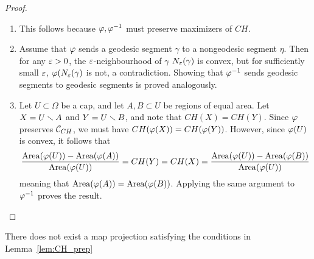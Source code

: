 \begin{proof}
  \begin{enumerate}
    \item This follows because $\varphi,\varphi^{-1}$ must 
      preserve maximizers of $CH$.
    \item Assume that $\varphi$ sends a geodesic 
      segment $\gamma$ to a nongeodesic segment 
      $\eta$. Then for any $\varepsilon>0$, the 
      $\varepsilon$-neighbourhood of $\gamma$ $N_{\varepsilon}(\gamma)$ 
      is convex, but for sufficiently small $\varepsilon$, 
      $\varphi(N_{\varepsilon}(\gamma)$ is not, a contradiction. 
      Showing that $\varphi^{-1}$ sends geodesic 
      segments to geodesic segments is proved analogously.
      
    \item Let $U\subset \Omega$ be a cap, and 
      let $A,B\subset U$ be regions of equal area. Let 
      $X = U\smallsetminus A$ and $Y = U\smallsetminus B$, and note that 
      $CH(X) = CH(Y)$. Since 
      $\varphi$ preserves $\mathcal{C}_{CH}$, we 
      must have $CH(\varphi(X)) = CH(\varphi(Y))$. However, 
      since $\varphi(U)$ is convex, it follows that 
      \begin{align*}
        \frac{\mathrm{Area}(\varphi(U))-\mathrm{Area}(\varphi(A))}
        {\mathrm{Area}(\varphi(U))}=
        CH(Y)=CH(X)=
        \frac{\mathrm{Area}(\varphi(U))-\mathrm{Area}(\varphi(B))}
        {\mathrm{Area}(\varphi(U))}
      \end{align*}
      meaning that $\mathrm{Area}(\varphi(A))=\mathrm{Area}(\varphi(B))$. 
      Applying the same argument to $\varphi^{-1}$ 
      proves the result.
  \end{enumerate}
\end{proof}
\begin{theorem}
  There does not exist a map projection satisfying the 
  conditions in Lemma~\ref{lem:CH_prep}
\end{theorem}
